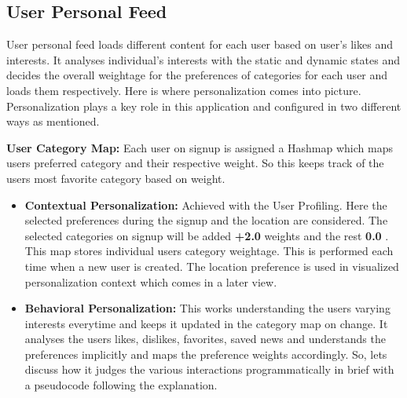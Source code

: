 \begin{enumerate}
 \subsection{User Personal Feed}  
 User personal feed loads different content for each user based on user's likes and interests. It analyses individual's interests with the static and dynamic states and decides the overall weightage for the preferences of categories for each user and loads them respectively.\newline
 Here is where personalization comes into picture. Personalization plays a key role in this application and configured in two different ways as mentioned.\newline
 
 \textbf{ User Category Map:}
 Each user on signup is assigned a Hashmap which maps users preferred category and their respective weight. So this keeps track of the users most favorite category based on weight.
 
 \begin{itemize}
     \item\textbf{ Contextual Personalization:} Achieved with the User Profiling. Here the selected preferences during the signup and the location are considered.
     The selected categories on signup will be added \textbf{+2.0 }weights and the rest\textbf{ 0.0 }. This map stores individual users category weightage. This is performed each time when a new user is created.\newline
     The location preference is used in visualized personalization context which comes in a later view.
      \item\textbf{ Behavioral Personalization:} This works understanding the users varying interests everytime and keeps it updated in the category map on change.
      It analyses the users likes, dislikes, favorites, saved news and understands the preferences implicitly and maps the preference weights accordingly. \newline
      So, lets discuss how it judges the various interactions programmatically in brief with a pseudocode following the explanation.
      
      \begin{enumerate}


\end{enumerate}
\end{itemize}
\end{enumerate}
